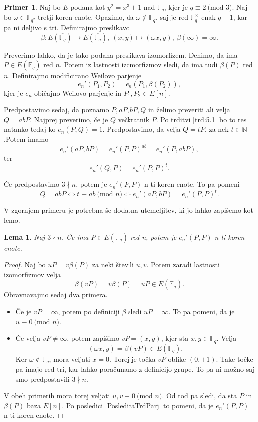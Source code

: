 \documentclass[12pt,a4paper,twoside]{article}
\theoremstyle{definition} %
\newtheorem{primer}[definicija]{Primer}
\theoremstyle{plain} %
\newtheorem{lema}[definicija]{Lema}
\numberwithin{equation}{section}  %
\newcommand{\N}{\mathbb N}
\newcommand{\F}{\mathbb F}
\newcommand{\E}[1]{E({#1})}
\newcommand{\MOD}[1]{\ \text{(mod }{#1}\text{)}}
\begin{document}
\begin{primer}

Naj bo $E$ podana kot $y^2=x^3+1$ nad $\F_q$, kjer je $q \equiv 2 \MOD{3}$. Naj bo $\omega \in \F_{q^2}$ tretji koren enote. Opazimo, da $\omega \notin \F_q$, saj je red $\F^{\times}_q$ enak $q-1$, kar pa ni deljivo s tri.
Definirajmo preslikavo
$$\beta:\E{\overline{\F_q}} \rightarrow \E{\overline{\F_q}}, \ (x,y) \mapsto (\omega x,y), \ \beta(\infty) = \infty.$$

Preverimo lahko, da je tako podana preslikava izomorfizem. Denimo, da ima $P \in \E{\overline{\F_q}}$ red $n$. Potem iz lastnosti izomorfizmov sledi, da ima tudi $\beta(P)$ red $n$.
Definirajmo modificirano Weilovo parjenje
$$e_n'(P_1,P_2) = e_n(P_1,\beta(P_2)),$$
kjer je $e_n$ običajno Weilovo parjenje in $P_1,P_2 \in E[n]$.

Predpostavimo sedaj, da poznamo $P,aP,bP,Q$ in želimo preveriti ali velja $Q=abP$. Najprej preverimo, če je $Q$ večkratnik $P$. Po trditvi \ref{trd:5.1} bo to res natanko tedaj ko $e_n(P,Q) = 1$.
Predpostavimo, da velja $Q = tP$, za nek $t \in \N$.Potem imamo
$$e_n'(aP,bP)=e_n'(P,P)^{ab} = e_n'(P,abP),$$
ter
$$e_n'(Q,P) = e_n'(P,P)^t.$$

Če predpostavimo $3 \nmid n$, potem je $e_n'(P,P)$ n-ti koren enote. To pa pomeni
$$Q=abP \iff t \equiv ab \MOD{n} \iff e_n'(aP,bP)=e_n'(P,P)^t.$$
\end{primer}

V zgornjem primeru je potrebna še dodatna utemeljitev, ki jo lahko zapišemo kot lemo.

\begin{lema}
\label{lema:6.1}
Naj $3 \nmid n$. Če ima $P \in \E{\F_q}$ red n, potem je $e_n'(P,P)$ n-ti koren enote.
\end{lema}

\begin{proof}

Naj bo $uP = v\beta(P)$ za neki števili $u,v$. Potem zaradi lastnosti izomorfizmov velja
$$\beta(vP) = v\beta(P) = uP \in \E{\F_q}.$$
Obravnavajmo sedaj dva primera.
\begin{itemize}
\item Če je $vP = \infty$, potem po definiciji $\beta$ sledi $uP = \infty$. To pa pomeni, da je $u \equiv 0 \MOD{n}$.
\item Če velja $vP \neq \infty$, potem zapišimo $vP = (x,y)$, kjer sta $x,y \in \F_q$. Velja
$$(\omega x,y) = \beta(vP) \in \E{\F_q}.$$
Ker $\omega \notin \F_q$, mora veljati $x = 0$. Torej je točka $vP$ oblike $(0,\pm 1)$. Take točke pa imajo red tri, kar lahko poračunamo z definicijo grupe. To pa ni možno saj smo predpostavili $3 \nmid n$.
\end{itemize}

V obeh primerih mora torej veljati $u,v \equiv 0 \MOD{n}$. Od tod pa sledi, da sta $P$ in $\beta(P)$ baza $E[n]$. Po posledici \ref{PosledicaTrdParj} to pomeni, da je $e_n'(P,P)$ n-ti koren enote.

\end{proof}
\end{document}
